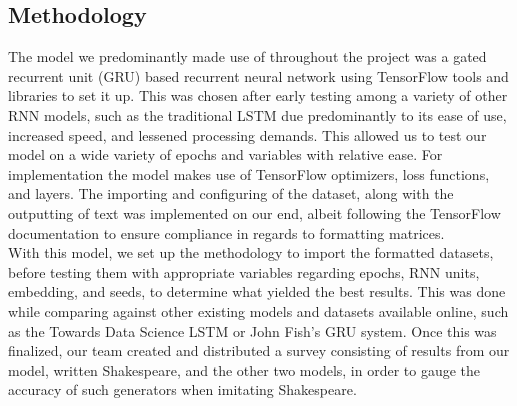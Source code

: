 \documentclass[11pt,a4paper]{article}
\begin{document}
\subsection{Methodology}
\label{sec:method}
The model we predominantly made use of throughout the project was a gated recurrent unit (GRU) based recurrent neural network using TensorFlow\cite{tensor} tools and libraries to set it up. This was chosen after early testing among a variety of other RNN models, such as the traditional LSTM due predominantly to its ease of use, increased speed, and lessened processing demands. This allowed us to test our model on a wide variety of epochs and variables with relative ease. For implementation the model makes use of TensorFlow\cite{tensor} optimizers, loss functions, and layers. The importing and configuring of the dataset, along with the outputting of text was implemented on our end, albeit following the TensorFlow\cite{tensor_tutorial} documentation to ensure compliance in regards to formatting matrices.\\
With this model, we set up the methodology to import the formatted datasets, before testing them with appropriate variables regarding epochs, RNN units, embedding, and seeds, to determine what yielded the best results. This was done while comparing against other existing models and datasets available online, such as the Towards Data Science LSTM\cite{TDS_model} or John Fish’s GRU\cite{fish_johnafishshakespeare_ai_2022} system. Once this was finalized, our team created and distributed a survey consisting of results from our model, written Shakespeare, and the other two models, in order to gauge the accuracy of such generators when imitating Shakespeare.
\end{document}
